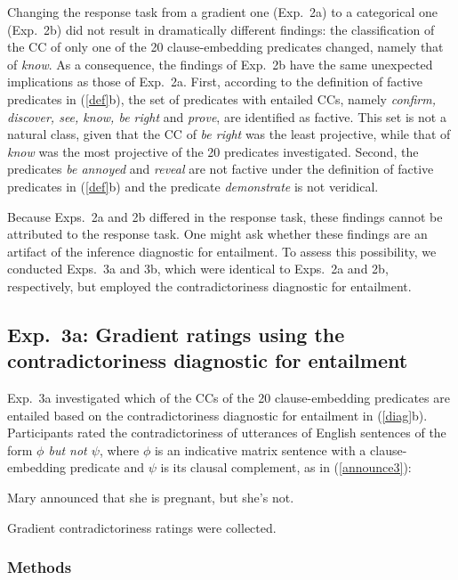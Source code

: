 \documentclass[11pt,fleqn]{article}
\newcommand{\6}{\mbox{$[\hspace*{-.6mm}[$}}
\newcommand{\9}{\mbox{$]\hspace*{-.6mm}]$}}
\begin{document}
Changing the response task from a gradient one (Exp.~2a) to a categorical one (Exp.~2b) did not result in dramatically different findings:  the classification of the CC of only one of the 20 clause-embedding predicates changed, namely that of {\em know}. As a consequence, the findings of Exp.~2b have the same unexpected implications as those of Exp.~2a. First, according to the definition of factive predicates in (\ref{def}b), the set of predicates with entailed CCs, namely {\em confirm, discover, see, know, be right} and {\em prove}, are identified as factive. This set is not a natural class, given that the CC of {\em be right} was the least projective, while that of {\em know} was the most projective of the 20 predicates investigated. Second, the predicates {\em be annoyed} and {\em reveal} are not factive under the definition of factive predicates in (\ref{def}b) and the predicate {\em demonstrate} is not veridical. 


Because Exps.~2a and 2b differed in the response task, these findings cannot be attributed to the response task. One might ask whether these findings are an artifact of the inference diagnostic for entailment. To assess this possibility, we conducted Exps.~3a and 3b, which were identical to Exps.~2a and 2b, respectively, but employed the contradictoriness diagnostic for entailment.

\subsection{Exp.~3a: Gradient ratings using the contradictoriness diagnostic for entailment}\label{s32}

Exp.~3a investigated which of the CCs of the 20 clause-embedding predicates are entailed based on the contradictoriness diagnostic for entailment in (\ref{diag}b). Participants rated the contradictoriness of utterances of English sentences of the form {\em $\phi$ but not $\psi$}, where $\phi$ is an indicative matrix sentence with a clause-embedding predicate and $\psi$ is its clausal complement, as in (\ref{announce3}):

\begin{exe}
\ex\label{announce3} Mary announced that she is pregnant, but she's not.
\end{exe}
Gradient contradictoriness ratings were collected.

\subsubsection{Methods}
\end{document}
